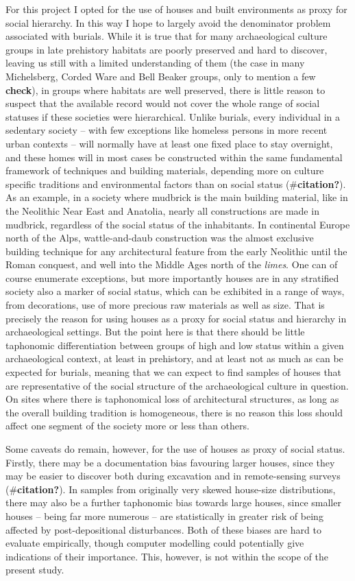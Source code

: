 \documentclass[
  12pt,
  a4paper, twoside]{book}
\begin{document}
For this project I opted for the use of houses and built environments as proxy for social hierarchy. In this way I hope to largely avoid the denominator problem associated with burials. While it is true that for many archaeological culture groups in late prehistory habitats are poorly preserved and hard to discover, leaving us still with a limited understanding of them (the case in many Michelsberg, Corded Ware and Bell Beaker groups, only to mention a few \textbf{check}), in groups where habitats are well preserved, there is little reason to suspect that the available record would not cover the whole range of social statuses if these societies were hierarchical. Unlike burials, every individual in a sedentary society -- with few exceptions like homeless persons in more recent urban contexts -- will normally have at least one fixed place to stay overnight, and these homes will in most cases be constructed within the same fundamental framework of techniques and building materials, depending more on culture specific traditions and environmental factors than on social status (\#\textbf{citation?}). As an example, in a society where mudbrick is the main building material, like in the Neolithic Near East and Anatolia, nearly all constructions are made in mudbrick, regardless of the social status of the inhabitants. In continental Europe north of the Alps, wattle-and-daub construction was the almost exclusive building technique for any architectural feature from the early Neolithic until the Roman conquest, and well into the Middle Ages north of the \emph{limes}. One can of course enumerate exceptions, but more importantly houses are in any stratified society also a marker of social status, which can be exhibited in a range of ways, from decorations, use of more precious raw materials as well as size. That is precisely the reason for using houses as a proxy for social status and hierarchy in archaeological settings. But the point here is that there should be little taphonomic differentiation between groups of high and low status within a given archaeological context, at least in prehistory, and at least not as much as can be expected for burials, meaning that we can expect to find samples of houses that are representative of the social structure of the archaeological culture in question. On sites where there is taphonomical loss of architectural structures, as long as the overall building tradition is homogeneous, there is no reason this loss should affect one segment of the society more or less than others.

Some caveats do remain, however, for the use of houses as proxy of social status. Firstly, there may be a documentation bias favouring larger houses, since they may be easier to discover both during excavation and in remote-sensing surveys (\#\textbf{citation?}). In samples from originally very skewed house-size distributions, there may also be a further taphonomic bias towards large houses, since smaller houses -- being far more numerous -- are statistically in greater risk of being affected by post-depositional disturbances. Both of these biases are hard to evaluate empirically, though computer modelling could potentially give indications of their importance. This, however, is not within the scope of the present study.
\end{document}
